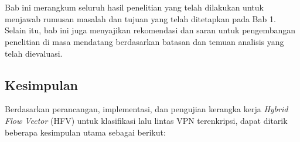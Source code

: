 \chapter{\babLima}
\label{cha:penutup}

Bab ini merangkum seluruh hasil penelitian yang telah dilakukan untuk menjawab rumusan masalah dan tujuan yang telah ditetapkan pada Bab 1. Selain itu, bab ini juga menyajikan rekomendasi dan saran untuk pengembangan penelitian di masa mendatang berdasarkan batasan dan temuan analisis yang telah dievaluasi.

\section{Kesimpulan}
\label{sec:kesimpulan}

Berdasarkan perancangan, implementasi, dan pengujian kerangka kerja \textit{Hybrid Flow Vector} (HFV) untuk klasifikasi lalu lintas VPN terenkripsi, dapat ditarik beberapa kesimpulan utama sebagai berikut:

